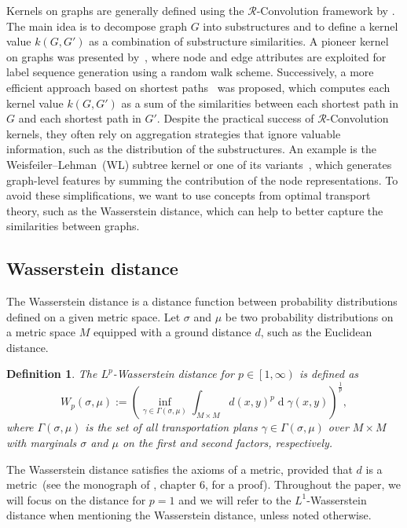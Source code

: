 \documentclass{article}
\newtheorem{definition}{Definition}
\begin{document}
Kernels on graphs are generally defined using the \mbox{$\mathcal{R}$-Convolution} framework by \cite{haussler1999convolution}. The main idea is to decompose graph $G$ into substructures and to define a kernel value $k(G,G')$ as a combination of substructure similarities. A pioneer kernel on graphs was presented by~\citep{kashima2003}, where node and edge attributes are exploited for label sequence generation using a random walk scheme. Successively, a more efficient approach based on shortest paths~\citep{borgwardt2005shortest} was proposed, which computes each kernel value $k(G,G')$ as a sum of the similarities between each shortest path in $G$ and each shortest path in $G'$. Despite the practical success of \mbox{$\mathcal{R}$-Convolution} kernels, they often rely on aggregation strategies that ignore valuable information, such as the distribution of the substructures. An example is the Weisfeiler--Lehman~(WL) subtree kernel or one of its variants~\citep{shervashidze2009FastSK, shervashidze2011weisfeiler, Rieck19b}, which generates graph-level features by summing the contribution of the node representations. To avoid these simplifications, we want to use concepts from optimal transport theory, such as the Wasserstein distance, which can help to better capture the similarities between graphs.  

\subsection{Wasserstein distance}

The Wasserstein distance is a distance function between probability distributions defined on a given metric space. Let $\sigma$ and $\mu$ be two probability distributions on a metric space $M$ equipped with a ground distance $d$, such as the Euclidean distance.
\begin{definition}
\label{def:wasserstein}
The $L^p$-Wasserstein distance for $p \in \left [1, \infty \right )$ is defined as
\begin{equation}
\label{eq:wass_definition}
    W_p(\sigma, \mu) := \left (  \inf_{\gamma \in \Gamma(\sigma, \mu)} {\displaystyle \int_{M\times M} d(x,y)^p \operatorname{d}\!\gamma(x,y)} \right )^{\frac{1}{p}},
\end{equation}
where $\Gamma(\sigma, \mu)$ is the set of all transportation plans $\gamma \in \Gamma(\sigma, \mu)$ over $M \times M$ with marginals $\sigma$ and $\mu$ on the first and second factors, respectively.
\end{definition}
The Wasserstein distance satisfies the axioms of a metric, provided that $d$ is a metric~(see the monograph of \citet{villani2008optimal}, chapter 6, for a proof).
Throughout the paper, we will focus on the distance for $p = 1$ and we will refer to the $L^1$-Wasserstein distance when mentioning the Wasserstein distance, unless noted otherwise.
\end{document}
